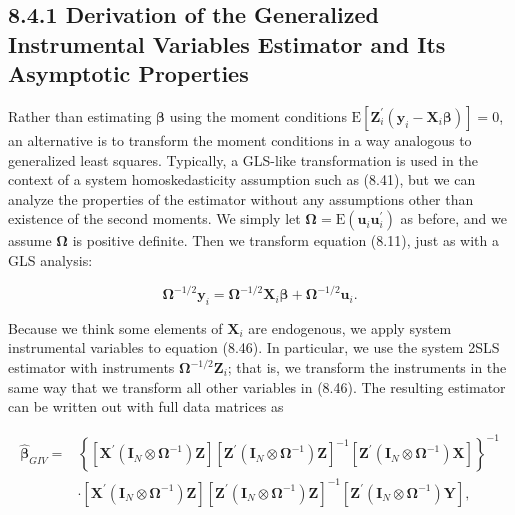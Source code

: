 \documentclass[10pt]{article}
\begin{document}
\subsection*{8.4.1 Derivation of the Generalized Instrumental Variables Estimator and Its Asymptotic Properties}
Rather than estimating $\boldsymbol{\beta}$ using the moment conditions $\mathrm{E}\left[\mathbf{Z}_{i}^{\prime}\left(\mathbf{y}_{i}-\mathbf{X}_{i} \boldsymbol{\beta}\right)\right]=0$, an alternative is to transform the moment conditions in a way analogous to generalized least squares. Typically, a GLS-like transformation is used in the context of a system homoskedasticity assumption such as (8.41), but we can analyze the properties of the estimator without any assumptions other than existence of the second moments. We simply let $\boldsymbol{\Omega}=\mathrm{E}\left(\mathbf{u}_{i} \mathbf{u}_{i}^{\prime}\right)$ as before, and we assume $\boldsymbol{\Omega}$ is positive definite. Then we transform equation (8.11), just as with a GLS analysis:


\begin{equation*}
\boldsymbol{\Omega}^{-1 / 2} \mathbf{y}_{i}=\boldsymbol{\Omega}^{-1 / 2} \mathbf{X}_{i} \boldsymbol{\beta}+\boldsymbol{\Omega}^{-1 / 2} \mathbf{u}_{i} . \tag{8.46}
\end{equation*}


Because we think some elements of $\mathbf{X}_{i}$ are endogenous, we apply system instrumental variables to equation (8.46). In particular, we use the system 2SLS estimator with instruments $\boldsymbol{\Omega}^{-1 / 2} \boldsymbol{Z}_{i}$; that is, we transform the instruments in the same way that we transform all other variables in (8.46). The resulting estimator can be written out with full data matrices as


\begin{align*}
\hat{\boldsymbol{\beta}}_{G I V}= & \left\{\left[\mathbf{X}^{\prime}\left(\mathbf{I}_{N} \otimes \boldsymbol{\Omega}^{-1}\right) \mathbf{Z}\right]\left[\mathbf{Z}^{\prime}\left(\mathbf{I}_{N} \otimes \boldsymbol{\Omega}^{-1}\right) \mathbf{Z}\right]^{-1}\left[\mathbf{Z}^{\prime}\left(\mathbf{I}_{N} \otimes \boldsymbol{\Omega}^{-1}\right) \mathbf{X}\right]\right\}^{-1} \\
& \cdot\left[\mathbf{X}^{\prime}\left(\mathbf{I}_{N} \otimes \boldsymbol{\Omega}^{-1}\right) \mathbf{Z}\right]\left[\mathbf{Z}^{\prime}\left(\mathbf{I}_{N} \otimes \boldsymbol{\Omega}^{-1}\right) \mathbf{Z}\right]^{-1}\left[\mathbf{Z}^{\prime}\left(\mathbf{I}_{N} \otimes \boldsymbol{\Omega}^{-1}\right) \mathbf{Y}\right], \tag{8.47}
\end{align*}
\end{document}
